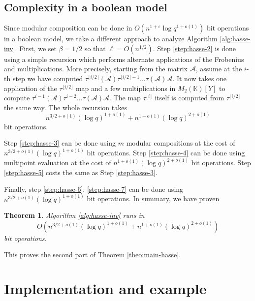 \documentclass[12pt]{article}
\theoremstyle{plain}
\newtheorem{theorem}{Theorem}
\theoremstyle{definition}
\def\K{\ensuremath{\mathbb{K}}}
\begin{document}
\subsection{Complexity in a boolean model}

Since modular composition can be done in $O(n^{1 + \varepsilon}\log q^{1 + o(1)})$ bit operations 
in a boolean model, we take a different approach to analyze Algorithm \ref{alg:hasse-inv}. First,  
we set $\beta = 1/2$ so that $\ell = O(n^{1/2})$. Step \ref{step:hasse-2} is done using a simple 
recursion which performs alternate applications of the Frobenius and multiplications. More 
precisely, starting from the matrix $\mathcal{A}$, assume at the $i$-th step we have computed 
$\tau^{\lfloor i/2 \rfloor}(\mathcal{A}) \tau^{\lfloor i/2 \rfloor-1} \ldots \tau(\mathcal{A}) 
\mathcal{A}$. It now takes one application of the $\tau^{\lfloor i/2 \rfloor}$ map and a few 
multiplications in $M_2(\K)[Y]$ to compute $\tau^{i-1}(\mathcal{A}) \tau^{i-2} \ldots 
\tau(\mathcal{A}) \mathcal{A}$. The map $\tau^{\lfloor i \rfloor}$ itself is computed from
$\tau^{\lfloor i/2 \rfloor}$ the same way. The whole recursion takes
\[ n^{3/2+o(1)} (\log q)^{1+o(1)} + n^{1+o(1)} (\log q)^{2+o(1)} \]
bit operations. 

Step \ref{step:hasse-3} can be done using $m$ modular compositions at the cost of $n^{3/2+o(1)} 
(\log q)^{1+o(1)}$ bit operations. Step \ref{step:hasse-4} can be done using multipoint evaluation 
\cite{vzGG} at the cost of $n^{1+o(1)} (\log q)^{2+o(1)}$ bit operations. Step \ref{step:hasse-5} 
costs the same as Step \ref{step:hasse-3}. 

Finally, step \ref{step:hasse-6}, \ref{step:hasse-7} can be done using $n^{3/2+o(1)} (\log 
q)^{1+o(1)}$ bit operations. In summary, we have proven 
\begin{theorem}
	\label{theo:hasse-inv}
	Algorithm \ref{alg:hasse-inv} runs in 
	\[O(n^{3/2+o(1)} (\log q)^{1+o(1)} + n^{1+o(1)} (\log q)^{2+o(1)})\]
	bit operations.
\end{theorem}
This proves the second part of Theorem \ref{theo:main-hasse}.



\section{Implementation and example}
\label{sec:impl}
\end{document}

